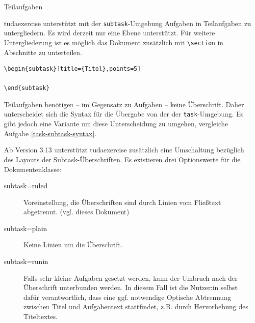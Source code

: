 \documentclass[
	ngerman,%
	accentcolor=9c,%
	points=true, für die Aktivierung der Punktereferenzen
]{tudaexercise}
\newcommand*{\code}[1]{\texttt{#1}}
\newcommand*{\cls}[1]{\textsf{#1}}
\let\tbs\textbackslash
\begin{document}
\begin{task}{Teilaufgaben}
	\begin{subtask}[title={Grundsturktur}]
		\cls{tudaexercise} unterstützt mit der \code{subtask}-Umgebung Aufgaben in Teilaufgaben zu untergliedern. Es wird derzeit nur eine Ebene unterstützt. Für weitere Untergliederung ist es möglich das Dokument zusätzlich mit \code{\tbs{}section} in Abschnitte zu unterteilen.

\begin{verbatim}
\begin{subtask}[title={Titel},points=5]

\end{subtask}
\end{verbatim}

		Teilaufgaben benötigen – im Gegensatz zu Aufgaben – keine Überschrift. Daher unterscheidet sich die Syntax für die Übergabe von der der \code{task}-Umgebung. Es gibt jedoch eine Variante um diese Unterscheidung zu umgehen, vergleiche Aufgabe \ref{task-subtask-syntax}.
	\end{subtask}

	\begin{subtask}[title={Anpassung der Überschriften}]
		Ab Version 3.13 unterstützt \cls{tudaexercise} zusätzlich eine Umschaltung bezüglich des Layouts der Subtask-Überschriften. Es existieren drei Optionswerte für die Dokumentenklasse:
		\begin{description}
			\item[subtask=ruled] Voreinstellung, die Überschriften sind durch Linien vom Fließtext abgetrennt. (vgl. dieses Dokument)
			\item[subtask=plain] Keine Linien um die Überschrift.
			\item[subtask=runin] Falls sehr kleine Aufgaben gesetzt werden, kann der Umbruch nach der Überschrift unterbunden werden. In diesem Fall ist die Nutzer:in selbst dafür verantwortlich, dass eine ggf. notwendige Optische Abtrennung zwischen Titel und Aufgabentext stattfindet, z.B. durch Hervorhebung des Titeltextes.
		\end{description}
	\end{subtask}
\end{task}
\end{document}

